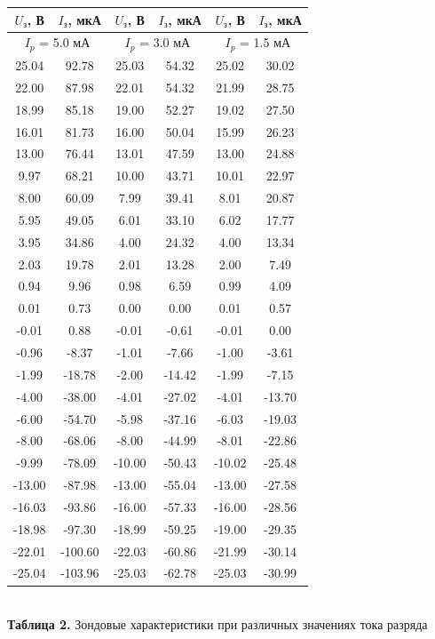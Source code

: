 \documentclass[a4paper,12pt]{article} %
\begin{document}
\begin{center}
\begin{tabular}{|c|c|c|c|c|c|}\hline
$U_\text{з}$, В & $I_\text{з}$, мкА & $U_\text{з}$, В & $I_\text{з}$, мкА & $U_\text{з}$, В & $I_\text{з}$, мкА \\\hline
\multicolumn{2}{|c}{$I_p$ = 5.0 мА} & \multicolumn{2}{|c}{$I_p$ = 3.0 мА} & \multicolumn{2}{|c|}{$I_p$ = 1.5 мА} \\\hline
 25.04 &   92.78 &  25.03 &  54.32 &  25.02 &  30.02 \\\hline
 22.00 &   87.98 &  22.01 &  54.32 &  21.99 &  28.75 \\\hline
 18.99 &   85.18 &  19.00 &  52.27 &  19.02 &  27.50 \\\hline
 16.01 &   81.73 &  16.00 &  50.04 &  15.99 &  26.23 \\\hline
 13.00 &   76.44 &  13.01 &  47.59 &  13.00 &  24.88 \\\hline
  9.97 &   68.21 &  10.00 &  43.71 &  10.01 &  22.97 \\\hline
  8.00 &   60.09 &   7.99 &  39.41 &   8.01 &  20.87 \\\hline
  5.95 &   49.05 &   6.01 &  33.10 &   6.02 &  17.77 \\\hline
  3.95 &   34.86 &   4.00 &  24.32 &   4.00 &  13.34 \\\hline
  2.03 &   19.78 &   2.01 &  13.28 &   2.00 &   7.49 \\\hline
  0.94 &    9.96 &   0.98 &   6.59 &   0.99 &   4.09 \\\hline
  0.01 &    0.73 &   0.00 &   0.00 &   0.01 &   0.57 \\\hline
 -0.01 &    0.88 &  -0.01 &  -0.61 &  -0.01 &   0.00 \\\hline
 -0.96 &   -8.37 &  -1.01 &  -7.66 &  -1.00 &  -3.61 \\\hline
 -1.99 &  -18.78 &  -2.00 & -14.42 &  -1.99 &  -7.15 \\\hline
 -4.00 &  -38.00 &  -4.01 & -27.02 &  -4.01 & -13.70 \\\hline
 -6.00 &  -54.70 &  -5.98 & -37.16 &  -6.03 & -19.03 \\\hline
 -8.00 &  -68.06 &  -8.00 & -44.99 &  -8.01 & -22.86 \\\hline
 -9.99 &  -78.09 & -10.00 & -50.43 & -10.02 & -25.48 \\\hline
-13.00 &  -87.98 & -13.00 & -55.04 & -13.00 & -27.58 \\\hline
-16.03 &  -93.86 & -16.00 & -57.33 & -16.00 & -28.56 \\\hline
-18.98 &  -97.30 & -18.99 & -59.25 & -19.00 & -29.35 \\\hline
-22.01 & -100.60 & -22.03 & -60.86 & -21.99 & -30.14 \\\hline
-25.04 & -103.96 & -25.03 & -62.78 & -25.03 & -30.99 \\\hline
\end{tabular} \\
\hfill \break \textbf {Таблица 2.} Зондовые характеристики при различных значениях тока разряда\\
\end{center}
\end{document}
